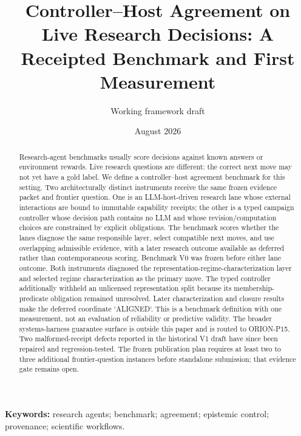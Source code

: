 \documentclass[11pt]{article}
\title{Controller--Host Agreement on Live Research Decisions: A Receipted Benchmark and First Measurement}
\author{Working framework draft}
\date{August 2026}
\begin{document}
\maketitle
\begin{abstract}
Research-agent benchmarks usually score decisions against known answers or environment rewards. Live research questions are different: the correct next move may not yet have a gold label. We define a controller--host agreement benchmark for this setting. Two architecturally distinct instruments receive the same frozen evidence packet and frontier question. One is an LLM-host-driven research lane whose external interactions are bound to immutable capability receipts; the other is a typed campaign controller whose decision path contains no LLM and whose revision/computation choices are constrained by explicit obligations. The benchmark scores whether the lanes diagnose the same responsible layer, select compatible next moves, and use overlapping admissible evidence, with a later research outcome available as deferred rather than contemporaneous scoring. Benchmark V0 was frozen before either lane outcome. Both instruments diagnosed the representation-regime-characterization layer and selected regime characterization as the primary move. The typed controller additionally withheld an unlicensed representation split because its membership-predicate obligation remained unresolved. Later characterization and closure results make the deferred coordinate `ALIGNED`. This is a benchmark definition with one measurement, not an evaluation of reliability or predictive validity. The broader systems-harness guarantee surface is outside this paper and is routed to ORION-P15. Two malformed-receipt defects reported in the historical V1 draft have since been repaired and regression-tested. The frozen publication plan requires at least two to three additional frontier-question instances before standalone submission; that evidence gate remains open.
\end{abstract}

\noindent\textbf{Keywords:} research agents; benchmark; agreement; epistemic control; provenance; scientific workflows.










\end{document}
